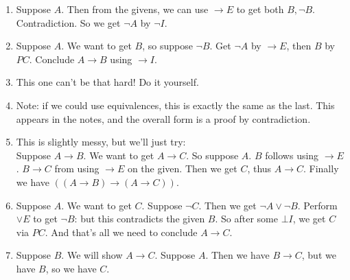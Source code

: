 \documentclass[10pt,a4paper]{article}
\begin{document}
\begin{enumerate}
    \item Suppose \(A\). Then from the givens, we can use 
    \( \rightarrow E \) to get both \(B, \neg B\). Contradiction. 
    So we get \( \neg A \) by \( \neg I\).

    \item Suppose \(A\). We want to get \(B\), so suppose \( \neg B\). 
    Get \( \neg A \) by \( \rightarrow E \), then \(B\) by \(PC\). 
    Conclude \(A \rightarrow B\) using \( \rightarrow I \).

    \item This one can't be that hard! Do it yourself.

    \item Note: if we could use equivalences, 
    this is exactly the same as the last. 
    This appears in the notes, and the overall form is a proof 
    by contradiction.

    \item This is slightly messy, but we'll just try: \\
    Suppose \( A \rightarrow B \). We want to get \( A \rightarrow C \). 
    So suppose \(A\). \(B\) follows using \( \rightarrow E \). 
    \( B \rightarrow C \) from using \( \rightarrow E \) on the given. 
    Then we get \(C\), thus \( A \rightarrow C \).
    Finally we have \( \left( (A \rightarrow B) \rightarrow (A \rightarrow C) \right) \).

    \item Suppose \(A\). We want to get \(C\). 
    Suppose \( \neg C \). Then we get \( \neg A \lor \neg B \). 
    Perform \( \lor E \) to get \( \neg B \): 
    but this contradicts the given \(B\). 
    So after some \( \bot I \), we get \(C\) via \(PC\).
    And that's all we need to conclude \( A \rightarrow C \).

    \item Suppose \(B\). We will show \( A \rightarrow C\).
    Suppose \(A\). Then we have \( B \rightarrow C \), but we have 
    \(B\), so we have \(C\).
\end{enumerate}
\end{document}
